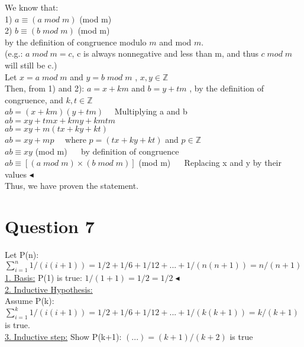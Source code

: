 \documentclass[a4paper, 12pt]{article}
\begin{document}
We know that:\\

1) $a \equiv (a \; mod \; m)$ (mod m)\\
2) $b \equiv (b \; mod \; m)$ (mod m) \\

by the definition of congruence modulo $m$ and mod $m$. \\
(e.g.: $a \; mod \; m = c$, c is always nonnegative and less than m, and thus $c \; mod \; m$ will still be c.)\\

Let $x = a \; mod \; m$  and $y= b\; mod\; m$ , $x,y \in \mathbb{Z}$\\

Then, from 1) and 2): $a = x + km$ and $b = y + tm$ , by the definition of congruence, and $k, t\in \mathbb{Z}$ \\

$ab = (x+km)(y+tm) \quad$ Multiplying a and b\\
$ab = xy + tmx + kmy +kmtm$\\
$ab=xy+m(tx+ky+kt)$\\
$ab=xy+mp \quad$ where $p =(tx+ky+kt)$ and $p\in \mathbb{Z}$\\
$ab \equiv xy $ (mod m)  $\quad$ by definition of congruence\\
$ab \equiv [(a \; mod \; m) \times (b \; mod \; m)]$ (mod m) $\quad$ Replacing x and y by their values $\blacktriangleleft$\\

Thus, we have proven the statement.

\section*{Question 7}
Let P(n): $\sum_{i=1}^{n} 1/(i(i+1)) = 1/2+1/6+1/12+...+1/(n(n+1)) = n/(n+1)$\\

\underline{1. Basis:} P(1) is true: $1/(1+1) = 1/2 = 1/2 \blacktriangleleft$\\

\underline{2. Inductive Hypothesis:} \\

Assume P(k): $\sum_{i=1}^{k} 1/(i(i+1)) = 1/2+1/6+1/12+...+1/(k(k+1)) = k/(k+1)$ is true.\\

\underline{3. Inductive step:} Show P(k+1): $(...) = (k+1)/(k+2)$ is true\\
\end{document}
